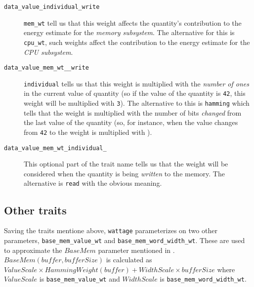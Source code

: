 \begin{description}
\item[\texttt{data\_value\_individual\_write}] \hfill

  \texttt{mem\_wt} tell us that this weight affects the quantity's
  contribution to the energy estimate for the \textit{memory
    subsystem}.  The alternative for this is \texttt{cpu\_wt}, such
  weights affect the contribution to the energy estimate for the
  \textit{CPU subsystem}.

\item[\texttt{data\_value\_mem\_wt\_\_write}] \hfill

  \texttt{individual} tells us that this weight is multiplied with the
  \textit{number of ones} in the current value of quantity (so if the
  value of the quantity is \texttt{42}, this weight will be multiplied
  with \texttt{3}).  The alternative to this is \texttt{hamming} which
  tells that the weight is multiplied with the number of bits
  \textit{changed} from the last value of the quantity (so, for
  instance, when the value changes from \texttt{42} to  the
  weight is multiplied with ).

\item[\texttt{data\_value\_mem\_wt\_individual\_}] \hfill

  This optional part of the trait name tells us that the weight will
  be considered when the quantity is being \textit{written} to the
  memory.  The alternative is \texttt{read} with the obvious meaning.
  
\end{description}

\subsection{Other traits}

Saving the traits mentione above, \texttt{wattage} parameterizes on
two other parameters, \texttt{base\_mem\_value\_wt} and
\texttt{base\_mem\_word\_width\_wt}.  These are used to approximate
the $BaseMem$ parameter mentioned in \cite{steinke}.  $BaseMem(buffer,
bufferSize)$ is calculated as $ValueScale \times HammingWeight(buffer)
+ WidthScale \times bufferSize$ where $ValueScale$ is
\texttt{base\_mem\_value\_wt} and $WidthScale$ is
\texttt{base\_mem\_word\_width\_wt}.
